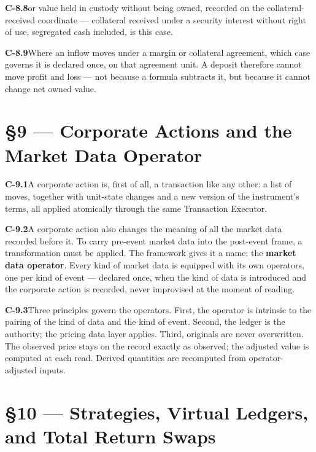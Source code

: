 \documentclass[11pt,a4paper]{article}
\newcommand{\clause}[2]{\par\medskip\noindent\textbf{#1}\hspace{0.6em}#2}
\begin{document}
\clause{C-8.8}{or value held in custody without being owned, recorded on the
collateral-received coordinate --- collateral received under a security interest
without right of use, segregated cash included, is this case.}

\clause{C-8.9}{Where an inflow moves under a margin or collateral agreement, which
case governs it is declared once, on that agreement unit. A deposit therefore
cannot move profit and loss --- not because a formula subtracts it, but because it
cannot change net owned value.}

\section*{\S9 --- Corporate Actions and the Market Data Operator}

\clause{C-9.1}{A corporate action is, first of all, a transaction like any other: a
list of moves, together with unit-state changes and a new version of the
instrument's terms, all applied atomically through the same Transaction Executor.}

\clause{C-9.2}{A corporate action also changes the meaning of all the market data
recorded before it. To carry pre-event market data into the post-event frame, a
transformation must be applied. The framework gives it a name: the \textbf{market
data operator}. Every kind of market data is equipped with its own operators, one
per kind of event --- declared once, when the kind of data is introduced and the
corporate action is recorded, never improvised at the moment of reading.}

\clause{C-9.3}{Three principles govern the operators. First, the operator is
intrinsic to the pairing of the kind of data and the kind of event. Second, the
ledger is the authority; the pricing data layer applies. Third, originals are
never overwritten. The observed price stays on the record exactly as observed; the
adjusted value is computed at each read. Derived quantities are recomputed from
operator-adjusted inputs.}

\section*{\S10 --- Strategies, Virtual Ledgers, and Total Return Swaps}
\end{document}
